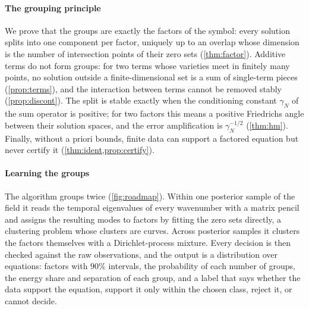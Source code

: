 \documentclass[11pt]{article}
\theoremstyle{plain}
\theoremstyle{definition}
\theoremstyle{remark}
\newcommand{\gN}{\gamma_{N}}                %
\begin{document}


\paragraph{The grouping principle} We prove that the groups are exactly the factors of the symbol: every solution splits
into one component per factor, uniquely up to an overlap whose dimension is the number of intersection points of their
zero sets (\cref{thm:factor}). Additive terms do not form groups: for two terms whose varieties meet in finitely many points, no solution outside a
finite-dimensional set is a sum of single-term pieces (\cref{prop:terms}), and the interaction between terms cannot be
removed stably (\cref{prop:discont}). The split is stable exactly when the conditioning constant $\gN$ of the sum operator
is positive; for two factors this means a positive Friedrichs angle between their solution spaces, and the error
amplification is $\gN^{-1/2}$ (\cref{thm:hm}). Finally, without a priori bounds, finite data can support a factored
equation but never certify it (\cref{thm:ident,prop:certify}).

\paragraph{Learning the groups} The algorithm groups twice (\cref{fig:roadmap}). Within one posterior sample of the field
it reads the temporal eigenvalues of every wavenumber with a matrix pencil and assigns the resulting modes to factors by
fitting the zero sets directly, a clustering problem whose clusters are curves. Across posterior samples it clusters the
factors themselves with a Dirichlet-process mixture. Every decision is then checked against the raw observations, and
the output is a distribution over equations: factors with $90\%$ intervals, the probability of each number of groups,
the energy share and separation of each group, and a label that says whether the data support the equation, support
it only within the chosen class, reject it, or cannot decide.
\end{document}
